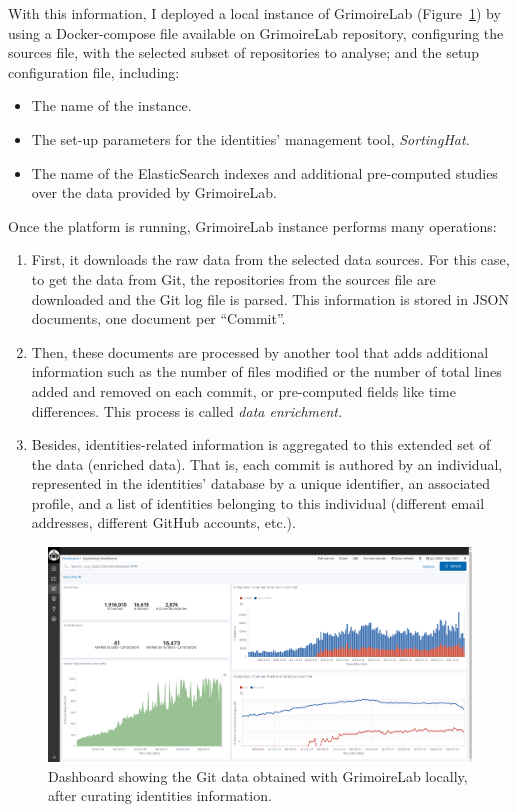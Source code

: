 \documentclass[a4paper, 12pt]{book}
\begin{document}
With this information, I deployed a local instance of GrimoireLab (Figure~\ref{fig:local-grimoirelab-git}) by using a Docker-compose file available on GrimoireLab repository, configuring the sources file, with the selected subset of repositories to analyse; and the setup configuration file, including:
\begin{itemize}
    \item The name of the instance.
    \item The set-up parameters for the identities' management tool, \emph{SortingHat}.
    \item The name of the ElasticSearch indexes and additional pre-computed studies over the data provided by GrimoireLab.
\end{itemize}

Once the platform is running, GrimoireLab instance performs many operations:
\begin{enumerate}
    \item First, it downloads the raw data from the selected data sources. For this case, to get the data from Git, the repositories from the sources file are downloaded and the Git log file is parsed. This information is stored in JSON documents, one document per ``Commit''.
    \item Then, these documents are processed by another tool that adds additional information such as the number of files modified or the number of total lines added and removed on each commit, or pre-computed fields like time differences. This process is called \textit{data enrichment.}
    \item Besides, identities-related information is aggregated to this extended set of the data (enriched data). That is, each commit is authored by an individual, represented in the identities' database by a unique identifier, an associated profile, and a list of identities belonging to this individual (different email addresses, different GitHub accounts, etc.).
\end{enumerate}

\begin{figure}
 \centering
  \includegraphics[width=15cm, keepaspectratio]{img/local-instance-grimoirelab-1.png}
  \caption{Dashboard showing the Git data obtained with GrimoireLab locally, after curating identities information.}
  \label{fig:local-grimoirelab-git}
\end{figure}
\end{document}

